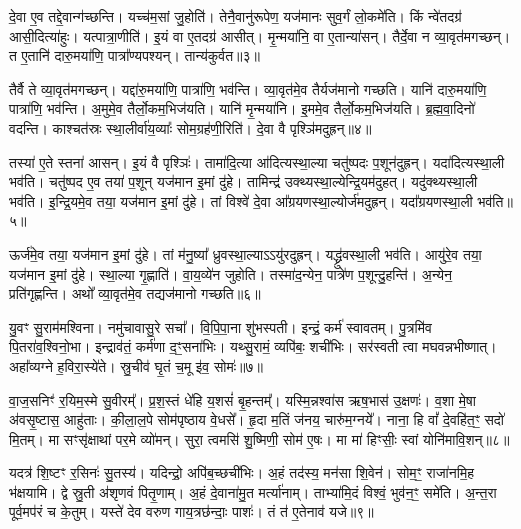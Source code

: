 दे॒वा ए॒व तद्दे॒वान्ग॑च्छन्ति।
यच्च॑म॒सां जु॒होति॑।
तेनै॒वानु॑रूपेण॒ यज॑मानः सुव॒र्गं लो॒कमे॑ति।
किं न्वे॑तदग्र॑ आसी॒दित्या॑हुः।
यत्पात्रा॒णीति॑।
इ॒यं वा ए॒तदग्र॑ आसीत्।
मृ॒न्मया॑नि॒ वा ए॒तान्या॑सन्।
तैर्दे॒वा न व्या॒वृत॑मगच्छन्।
त ए॒तानि॑ दारु॒मया॑णि॒ पात्रा᳚ण्यपश्यन्।
तान्य॑कुर्वत॥३॥\ip

तैर्वै ते व्या॒वृत॑मगच्छन्।
यद्दा॑रु॒मया॑णि॒ पात्रा॑णि॒ भव॑न्ति।
व्या॒वृत॑मे॒व तैर्यज॑मानो गच्छति।
यानि॑ दारु॒मया॑णि॒ पात्रा॑णि॒ भव॑न्ति।
अ॒मुमे॒व तैर्लो॒कम॒भि\-ज॑यति।
यानि॑ मृ॒न्मया॑नि।
इ॒ममे॒व तैर्लो॒कम॒भि\-ज॑यति।
ब्र॒ह्म॒वा॒दिनो॑ वदन्ति।
काश्चत॑स्रः स्था॒लीर्वा॑य॒व्याः᳚ सोम॒ग्रह॑णी॒रिति॑।
दे॒वा वै पृश्ञि॑मदुह्रन्॥४॥\ip

तस्या॑ ए॒ते स्तना॑ आसन्।
इ॒यं वै पृश्ञिः॑।
तामा॑दि॒त्या आ॑दित्यस्था॒ल्या चतु॑ष्पदः प॒शून॑दुह्रन्।
यदा॑दित्यस्था॒ली भव॑ति।
चतु॑ष्पद ए॒व तया॑ प॒शून् यज॑मान इ॒मां दु॑हे।
तामिन्द्र॑ उक्थ्यस्था॒ल्येन्द्रि॒यम॑दुहत्।
यदु॑क्थ्यस्था॒ली भव॑ति।
इ॒न्द्रि॒यमे॒व तया॒ यज॑मान इ॒मां दु॑हे।
तां विश्वे॑ दे॒वा आ᳚ग्रयणस्था॒ल्योर्ज॑मदुह्रन्।
यदा᳚ग्रयणस्था॒ली भव॑ति॥५॥\ip

ऊर्ज॑मे॒व तया॒ यज॑मान इ॒मां दु॑हे।
तां म॑नु॒ष्या᳚ ध्रुवस्था॒ल्या\-ऽऽयु॑रदुह्रन्।
यद्ध्रु॑वस्था॒ली भव॑ति।
आयु॑रे॒व तया॒ यज॑मान इ॒मां दु॑हे।
स्था॒ल्या गृ॒ह्णाति॑।
वा॒य॒व्ये॑न जुहोति।
तस्मा॑द॒न्येन॒ पात्रे॑ण प॒शून्दु॒हन्ति॑।
अ॒न्येन॒ प्रति॑\-गृह्णन्ति।
अथो᳚ व्या॒वृत॑मे॒व तद्यज॑मानो गच्छति॥६॥\ip\anuvakamend[ग्र॒ह॒त्वं ग्रहां᳚ जु॒होत्य॑कुर्वतादुह्रन्नाग्रयणस्था॒ली भव॑ति॒ नव॑ च]

यु॒वꣳ सु॒राम॑मश्विना।
नमु॑चावासु॒रे सचा᳚।
वि॒पि॒पा॒ना शु॑भस्पती।
इन्द्रं॒ कर्म॑ स्वावतम्।
पु॒त्रमि॑व पि॒तरा॑व॒श्विनो॒भा।
इन्द्राव॑तं॒ कर्म॑णा द॒ꣳ॒सना॑भिः।
यथ्सु॒रामं॒ व्यपि॑बः॒ शची॑भिः।
सर॑स्वती त्वा मघवन्नभीष्णात्।
अहा᳚व्यग्ने ह॒विरा॒स्ये॑ते।
स्रु॒चीव॑ घृ॒तं च॒मू इ॑व॒ सोमः॑॥७॥\ip

वा॒ज॒सनिꣳ॑ र॒यिम॒स्मे सु॒वीरम्᳚।
प्र॒श॒स्तं धे॑हि य॒शसं॑ बृ॒हन्तम्᳚।
यस्मि॒न्नश्वा॑स ऋष॒भास॑ उ॒क्षणः॑।
व॒शा मे॒षा अ॑वसृ॒ष्टास॒ आहु॑ताः।
की॒ला॒ल॒पे सोम॑पृष्ठाय वे॒धसे᳚।
हृ॒दा म॒तिं ज॑नय॒ चारु॑म॒ग्नये᳚।
नाना॒ हि वां᳚ दे॒वहि॑त॒ꣳ॒ सदो॑ मि॒तम्।
मा सꣳसृ॑क्षाथां पर॒मे व्यो॑मन्।
सुरा॒ त्वमसि॑ शु॒ष्मिणी॒ सोम॑ ए॒षः।
मा मा॑ हिꣳसीः॒ स्वां योनि॑मावि॒शन्॥८॥\ip

यदत्र॑ शि॒ष्टꣳ र॒सिनः॑ सु॒तस्य॑।
यदिन्द्रो॒ अपि॑ब॒च्छची॑भिः।
अ॒हं तद॑स्य॒ मन॑सा शि॒वेन॑।
सोम॒ꣳ॒ राजा॑नमि॒ह भ॑क्षयामि।
द्वे स्रु॒ती अ॑शृणवं पितृ॒णाम्।
अ॒हं दे॒वाना॑मु॒त मर्त्या॑नाम्।
ताभ्या॑मि॒दं विश्वं॒ भुव॑न॒ꣳ॒ समे॑ति।
अ॒न्त॒रा पूर्व॒मप॑रं च के॒तुम्।
यस्ते॑ देव वरुण गाय॒त्रछ॑न्दाः॒ पाशः॑।
तं त॑ ए॒तेनाव॑ यजे॥९॥\ip

